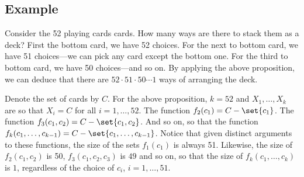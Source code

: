 \subsection*{Example}

Consider the 52 playing cards cards.
How many ways are there to stack them as a deck?
First the bottom card, we have 52 choices.
For the next to bottom card, we have 51 choices---we can pick any card except the bottom one.
For the third to bottom card, we have 50 choices---and so on.
By applying the above proposition, we can deduce that there are $52\cdot 51\cdot 50\cdots1$ ways of arranging the deck.

Denote the set of cards by $C$.
For the above proposition, $k = 52$ and $X_1, \dots , X_k$ are so that $X_i = C$ for all $i = 1, \dots , 52$.
The function $f_2(c_1) = C - \set{c_1}$.
The function $f_3(c_1, c_2) = C - \set{c_1, c_2}$.
And so on, so that the function $f_k(c_1, \dots , c_{k-1}) = C - \set{c_1, \dots , c_{k-1}}$.
Notice that given distinct arguments to these functions, the size of the sets $f_1(c_1)$ is always 51.
Likewise, the size of $f_2(c_1, c_2)$ is 50, $f_3(c_1, c_2, c_3)$ is $49$ and so on, so that the size of $f_k(c_1, \dots , c_k)$ is $1$, regardless of the choice of $c_i$, $i = 1, \dots , 51$.

\blankpage